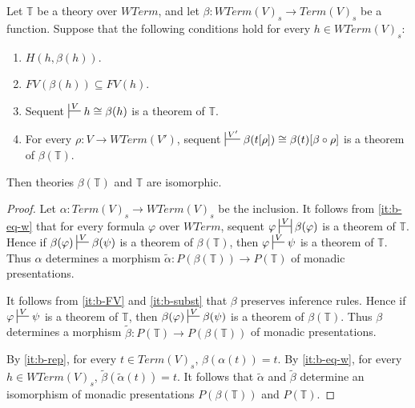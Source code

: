 \documentclass{elsarticle}
\theoremstyle{definition}
\theoremstyle{remark}
\numberwithin{figure}{section}
\begin{document}
\begin{lem}[w-standard]
Let $\mathbb{T}$ be a theory over $WTerm$, and let $\beta : WTerm(V)_s \to Term(V)_s$ be a function.
Suppose that the following conditions hold for every $h \in WTerm(V)_s$:
\begin{enumerate}
\item \label{it:b-rep} $H(h,\beta(h))$.
\item \label{it:b-FV} $FV(\beta(h)) \subseteq FV(h)$.
\item \label{it:b-eq-w} Sequent $\sststile{}{V} h \cong \beta(h)$ is a theorem of $\mathbb{T}$.
\item \label{it:b-subst} For every $\rho : V \to WTerm(V')$, sequent $\sststile{}{V'} \beta(t[\rho]) \cong \beta(t)[\beta \circ \rho]$ is a theorem of $\beta(\mathbb{T})$.
\end{enumerate}
Then theories $\beta(\mathbb{T})$ and $\mathbb{T}$ are isomorphic.
\end{lem}
\begin{proof}
Let $\alpha : Term(V)_s \to WTerm(V)_s$ be the inclusion.
It follows from \eqref{it:b-eq-w} that for every formula $\varphi$ over $WTerm$, sequent $\varphi \ssststile{}{V} \beta(\varphi)$ is a theorem of $\mathbb{T}$.
Hence if $\beta(\varphi) \sststile{}{V} \beta(\psi)$ is a theorem of $\beta(\mathbb{T})$, then $\varphi \sststile{}{V} \psi$ is a theorem of $\mathbb{T}$.
Thus $\alpha$ determines a morphism $\widetilde{\alpha} : P(\beta(\mathbb{T})) \to P(\mathbb{T})$ of monadic presentations.

It follows from \eqref{it:b-FV} and \eqref{it:b-subst} that $\beta$ preserves inference rules.
Hence if $\varphi \sststile{}{V} \psi$ is a theorem of $\mathbb{T}$, then $\beta(\varphi) \sststile{}{V} \beta(\psi)$ is a theorem of $\beta(\mathbb{T})$.
Thus $\beta$ determines a morphism $\widetilde{\beta} : P(\mathbb{T}) \to P(\beta(\mathbb{T}))$ of monadic presentations.

By \eqref{it:b-rep}, for every $t \in Term(V)_s$, $\beta(\alpha(t)) = t$.
By \eqref{it:b-eq-w}, for every $h \in WTerm(V)_s$, $\widetilde{\beta}(\widetilde{\alpha}(t)) = t$.
It follows that $\widetilde{\alpha}$ and $\widetilde{\beta}$ determine an isomorphism of monadic presentations $P(\beta(\mathbb{T}))$ and $P(\mathbb{T})$.
\end{proof}
\end{document}
